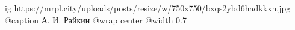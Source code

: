  
 
 
 
 

\ifcmt
  ig https://mrpl.city/uploads/posts/resize/w/750x750/bxqs2ybd6hadkkxn.jpg
	@caption А. И. Райкин
  @wrap center
  @width 0.7
\fi
